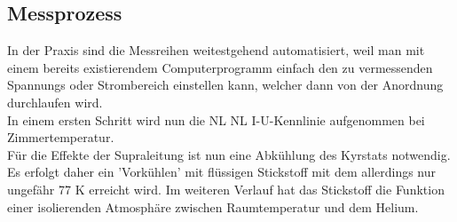 \documentclass[twoside,        %
               BCOR12mm,       %
               english,ngerman, %
               fleqn,headsepline=false,footsepline=false
              ]{MFPREPORT}
\begin{document}
\subsection{Messprozess}
In der Praxis sind die Messreihen weitestgehend automatisiert, weil man mit einem bereits existierendem Computerprogramm einfach den zu vermessenden Spannungs oder Strombereich einstellen kann, welcher dann von der Anordnung durchlaufen wird.
\\
In einem ersten Schritt wird nun die NL NL I-U-Kennlinie aufgenommen bei Zimmertemperatur.
\\
Für die Effekte der Supraleitung ist nun eine Abkühlung des Kyrstats notwendig. 
Es erfolgt daher ein 'Vorkühlen' mit flüssigen Stickstoff mit dem allerdings nur ungefähr 77 K erreicht wird. 
Im weiteren Verlauf hat das Stickstoff die Funktion einer isolierenden Atmosphäre zwischen Raumtemperatur und dem Helium.
\end{document}

